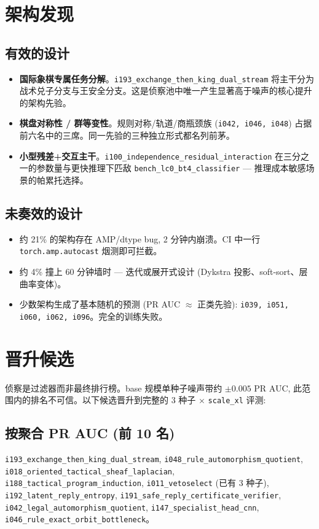 \documentclass[10pt,a4paper]{article}
\begin{document}
\clearpage
\section{架构发现}

\subsection*{有效的设计}
\begin{itemize}
\item \textbf{国际象棋专属任务分解}。\texttt{i193\_exchange\_then\_king\_dual\_stream}
将主干分为战术兑子分支与王安全分支。这是侦察池中唯一产生显著高于噪声的核心提升的架构先验。
\item \textbf{棋盘对称性 / 群等变性}。规则对称/轨道/商瓶颈族 (\texttt{i042, i046, i048}) 占据前六名中的三席。同一先验的三种独立形式都名列前茅。
\item \textbf{小型残差+交互主干}。\texttt{i100\_independence\_residual\_interaction} 在三分之一的参数量与更快推理下匹敌 \texttt{bench\_lc0\_bt4\_classifier} --- 推理成本敏感场景的帕累托选择。
\end{itemize}

\subsection*{未奏效的设计}
\begin{itemize}
\item 约 21\% 的架构存在 AMP/dtype bug, 2 分钟内崩溃。CI 中一行 \texttt{torch.amp.autocast} 烟测即可拦截。
\item 约 4\% 撞上 60 分钟墙时 --- 迭代或展开式设计 (Dykstra 投影、soft-sort、层曲率变体)。
\item 少数架构生成了基本随机的预测 (PR AUC $\approx$ 正类先验): \texttt{i039, i051, i060, i062, i096}。完全的训练失败。
\end{itemize}

\section{晋升候选}

侦察是过滤器而非最终排行榜。base 规模单种子噪声带约 $\pm 0.005$ PR AUC, 此范围内的排名不可信。以下候选晋升到完整的 3 种子 $\times$ \texttt{scale\_xl} 评测:

\subsection*{按聚合 PR AUC (前 10 名)}
\texttt{i193\_exchange\_then\_king\_dual\_stream}, \texttt{i048\_rule\_automorphism\_quotient}, \texttt{i018\_oriented\_tactical\_sheaf\_laplacian}, \texttt{i188\_tactical\_program\_induction}, \texttt{i011\_vetoselect} (已有 3 种子), \texttt{i192\_latent\_reply\_entropy}, \texttt{i191\_safe\_reply\_certificate\_verifier}, \texttt{i042\_legal\_automorphism\_quotient}, \texttt{i147\_specialist\_head\_cnn}, \texttt{i046\_rule\_exact\_orbit\_bottleneck}。
\end{document}

